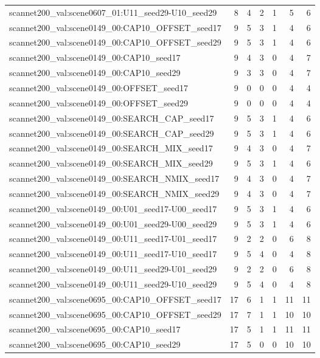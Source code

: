 \begin{table}[t]
\begin{tabular}{lrrrrrr}
scannet200\_val:scene0607\_01:U11\_seed29-U10\_seed29 & 8 & 4 & 2 & 1 & 5 & 6 \\
scannet200\_val:scene0149\_00:CAP10\_OFFSET\_seed17 & 9 & 5 & 3 & 1 & 4 & 6 \\
scannet200\_val:scene0149\_00:CAP10\_OFFSET\_seed29 & 9 & 5 & 3 & 1 & 4 & 6 \\
scannet200\_val:scene0149\_00:CAP10\_seed17 & 9 & 4 & 3 & 0 & 4 & 7 \\
scannet200\_val:scene0149\_00:CAP10\_seed29 & 9 & 3 & 3 & 0 & 4 & 7 \\
scannet200\_val:scene0149\_00:OFFSET\_seed17 & 9 & 0 & 0 & 0 & 4 & 4 \\
scannet200\_val:scene0149\_00:OFFSET\_seed29 & 9 & 0 & 0 & 0 & 4 & 4 \\
scannet200\_val:scene0149\_00:SEARCH\_CAP\_seed17 & 9 & 5 & 3 & 1 & 4 & 6 \\
scannet200\_val:scene0149\_00:SEARCH\_CAP\_seed29 & 9 & 5 & 3 & 1 & 4 & 6 \\
scannet200\_val:scene0149\_00:SEARCH\_MIX\_seed17 & 9 & 4 & 3 & 0 & 4 & 7 \\
scannet200\_val:scene0149\_00:SEARCH\_MIX\_seed29 & 9 & 5 & 3 & 1 & 4 & 6 \\
scannet200\_val:scene0149\_00:SEARCH\_NMIX\_seed17 & 9 & 4 & 3 & 0 & 4 & 7 \\
scannet200\_val:scene0149\_00:SEARCH\_NMIX\_seed29 & 9 & 4 & 3 & 0 & 4 & 7 \\
scannet200\_val:scene0149\_00:U01\_seed17-U00\_seed17 & 9 & 5 & 3 & 1 & 4 & 6 \\
scannet200\_val:scene0149\_00:U01\_seed29-U00\_seed29 & 9 & 5 & 3 & 1 & 4 & 6 \\
scannet200\_val:scene0149\_00:U11\_seed17-U01\_seed17 & 9 & 2 & 2 & 0 & 6 & 8 \\
scannet200\_val:scene0149\_00:U11\_seed17-U10\_seed17 & 9 & 5 & 4 & 0 & 4 & 8 \\
scannet200\_val:scene0149\_00:U11\_seed29-U01\_seed29 & 9 & 2 & 2 & 0 & 6 & 8 \\
scannet200\_val:scene0149\_00:U11\_seed29-U10\_seed29 & 9 & 5 & 4 & 0 & 4 & 8 \\
scannet200\_val:scene0695\_00:CAP10\_OFFSET\_seed17 & 17 & 6 & 1 & 1 & 11 & 11 \\
scannet200\_val:scene0695\_00:CAP10\_OFFSET\_seed29 & 17 & 7 & 1 & 1 & 10 & 10 \\
scannet200\_val:scene0695\_00:CAP10\_seed17 & 17 & 5 & 1 & 1 & 11 & 11 \\
scannet200\_val:scene0695\_00:CAP10\_seed29 & 17 & 5 & 0 & 0 & 10 & 10 \\

\end{tabular}
\end{table}
